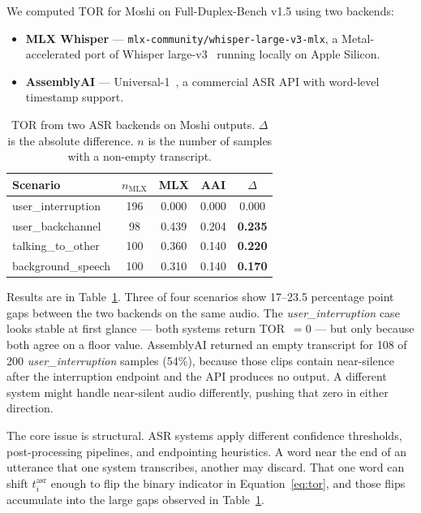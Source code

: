 \documentclass[a4paper]{article}
\begin{document}
We computed TOR for Moshi on Full-Duplex-Bench v1.5 using two backends:
\begin{itemize}
    \item \textbf{MLX Whisper} --- \texttt{mlx-community/whisper-large-v3-mlx},
          a Metal-accelerated port of Whisper large-v3~\cite{radford2023whisper}
          running locally on Apple Silicon.
    \item \textbf{AssemblyAI} --- Universal-1~\cite{assemblyai2024}, a
          commercial ASR API with word-level timestamp support.
\end{itemize}

\begin{table}[t]
  \centering
  \caption{TOR from two ASR backends on Moshi outputs. $\Delta$ is the
           absolute difference. $n$ is the number of samples with a
           non-empty transcript.}
  \label{tab:asr_sensitivity}
  \begin{tabular}{lcccc}
    \toprule
    Scenario & $n_{\text{MLX}}$ & MLX & AAI & $\Delta$ \\
    \midrule
    user\_interruption   & 196 & 0.000 & 0.000 & 0.000 \\
    user\_backchannel    &  98 & 0.439 & 0.204 & \textbf{0.235} \\
    talking\_to\_other   & 100 & 0.360 & 0.140 & \textbf{0.220} \\
    background\_speech   & 100 & 0.310 & 0.140 & \textbf{0.170} \\
    \bottomrule
  \end{tabular}
\end{table}

Results are in Table~\ref{tab:asr_sensitivity}. Three of four scenarios show
17--23.5 percentage point gaps between the two backends on the same audio.
The \emph{user\_interruption} case looks stable at first glance --- both
systems return TOR~$= 0$ --- but only because both agree on a floor value.
AssemblyAI returned an empty transcript for 108 of 200
\emph{user\_interruption} samples (54\%), because those clips contain
near-silence after the interruption endpoint and the API produces no output.
A different system might handle near-silent audio differently, pushing that
zero in either direction.

The core issue is structural. ASR systems apply different confidence thresholds,
post-processing pipelines, and endpointing heuristics. A word near the end of
an utterance that one system transcribes, another may discard. That one word
can shift $t^{\text{asr}}_i$ enough to flip the binary indicator in
Equation~\ref{eq:tor}, and those flips accumulate into the large gaps
observed in Table~\ref{tab:asr_sensitivity}.
\end{document}
